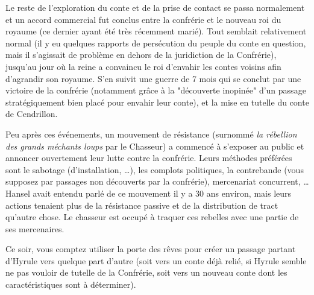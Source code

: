 {	\par Le reste de l'exploration du conte et de la prise de contact se passa normalement et un accord commercial fut conclus entre la confrérie et le nouveau roi du royaume (ce dernier ayant été très récemment marié). Tout semblait relativement normal (il y eu quelques rapports de persécution du peuple du conte en question, mais il s'agissait de problème en dehors de la juridiction de la Confrérie), jusqu'au jour où la reine a convaincu le roi d'envahir les contes voisins afin d'agrandir son royaume. S'en suivit une guerre de 7 mois qui se conclut par une victoire de la confrérie (notamment grâce à la "découverte inopinée" d'un passage stratégiquement bien placé pour envahir leur conte), et la mise en tutelle du conte de Cendrillon.
	
	\par Peu après ces événements, un mouvement de résistance (surnommé \emph{la rébellion des grands méchants loups} par le Chasseur) a commencé à s'exposer au public et annoncer ouvertement leur lutte contre la confrérie. Leurs méthodes préférées sont le sabotage (d'installation, \dots), les complots politiques, la contrebande (vous supposez par passages non découverts par la confrérie), mercenariat concurrent, \dots Hansel avait entendu parlé de ce mouvement il y a 30 ans environ, mais leurs actions tenaient plus de la résistance passive et de la distribution de tract qu'autre chose. Le chasseur est occupé à traquer ces rebelles avec une partie de ses mercenaires.
	
	\vspace{0.4cm}
	\par Ce soir, vous comptez utiliser la porte des rêves pour créer un passage partant d'Hyrule vers quelque part d'autre (soit vers un conte déjà relié, si Hyrule semble ne pas vouloir de tutelle de la Confrérie, soit vers un nouveau conte dont les caractéristiques sont à déterminer).
}







